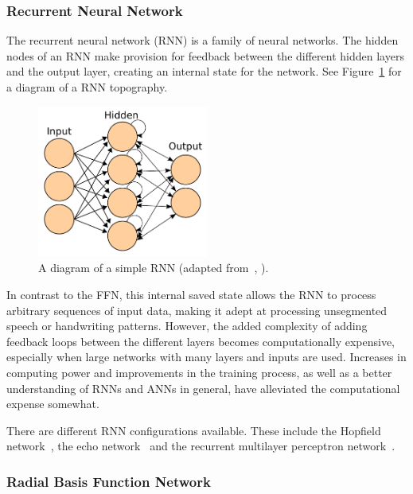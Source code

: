 \subsubsection{Recurrent Neural Network}

The recurrent neural network (RNN) is a family of neural networks. The hidden nodes of an RNN make provision for feedback between the different hidden layers and the output layer, creating an internal state for the network. See Figure~\ref{fig:chap2-rnn-diagram} for a diagram of a RNN topography.

\begin{figure}
 \centering
 \includegraphics[width=0.5\textwidth]{figures/chapter2/rnn_diagram}
 \caption[Diagram of a simple RNN.]{A diagram of a simple RNN (adapted from~\citeauthor{ann-wiki-pic}, \citeyear{ann-wiki-pic}).}
\label{fig:chap2-rnn-diagram}
\end{figure}

In contrast to the FFN, this internal saved state allows the RNN to process arbitrary sequences of input data, making it adept at processing unsegmented speech or handwriting patterns. However, the added complexity of adding feedback loops between the different layers becomes computationally expensive, especially when large networks with many layers and inputs are used. Increases in computing power and improvements in the training process, as well as a better understanding of RNNs and ANNs in general, have alleviated the computational expense somewhat.

There are different RNN configurations available. These include the Hopfield network~\citep{hopfield1982neural}, the echo network~\citep{jaeger2001echo} and the recurrent multilayer perceptron network~\citep{tutschku1995recurrent}.

\subsubsection{Radial Basis Function Network}

